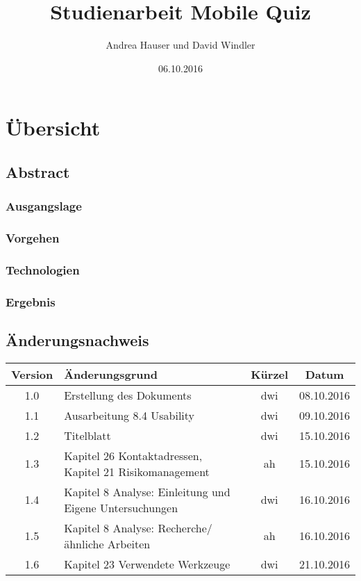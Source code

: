 \documentclass[12pt, a4paper]{report}
\date{06.10.2016}
\title{Studienarbeit Mobile Quiz}
\author{Andrea Hauser und David Windler}
\begin{document}
	
	
	
		
	\part{Übersicht}
	
	
	\chapter{Abstract}
	
	\section{Ausgangslage}
	
	
	\section{Vorgehen}
	
	
	\section{Technologien}
	
	
	
	\section{Ergebnis}
	
	
	
	
	
	\chapter{Änderungsnachweis}
	\begin{tabularx}{\linewidth}{|c|X|c|c|}
		\hline
		\textbf{Version} & \textbf{Änderungsgrund} & \textbf{Kürzel} & \textbf{Datum} \\
		\hline
		1.0 & Erstellung des Dokuments & dwi & 08.10.2016 \\
		\hline
		1.1 & Ausarbeitung 8.4 Usability & dwi & 09.10.2016 \\
		\hline
		1.2 & Titelblatt & dwi & 15.10.2016 \\
		\hline
		1.3 & Kapitel 26 Kontaktadressen, \newline Kapitel 21 Risikomanagement & ah & 15.10.2016 \\
		\hline
		1.4 & Kapitel 8 Analyse: Einleitung und Eigene Untersuchungen & dwi & 16.10.2016 \\
		\hline
		1.5 & Kapitel 8 Analyse: Recherche/ähnliche Arbeiten & ah & 16.10.2016 \\
		\hline
		1.6 & Kapitel 23 Verwendete Werkzeuge & dwi & 21.10.2016 \\
		\hline
	\end{tabularx}
	
\end{document}
